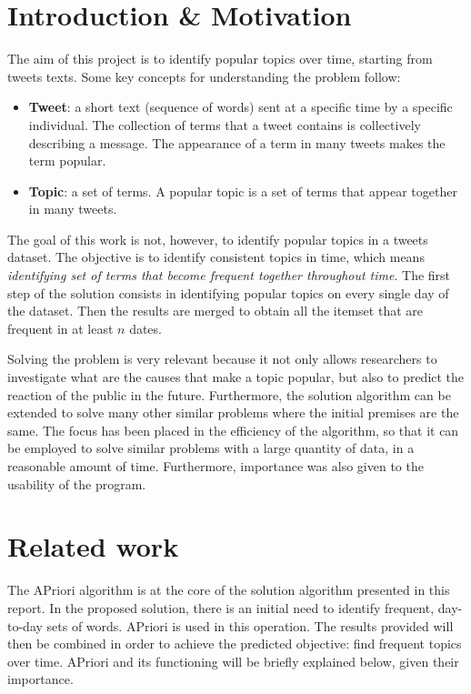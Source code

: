 
\section{Introduction \& Motivation}\label{sect_intro}

The aim of this project is to identify popular topics over time, starting from tweets texts. Some key concepts for understanding the problem follow:
\begin{itemize}
  \item \textbf{Tweet}: a short text (sequence of words) sent at a specific time by a specific individual. The collection of terms that a tweet contains is collectively describing a message. The appearance of a term in many tweets makes the term popular.
  \item \textbf{Topic}: a set of terms. A popular topic is a set of terms that appear together in many tweets.
\end{itemize}

The goal of this work is not, however, to identify popular topics in a tweets dataset. The objective is to identify consistent topics in time, which means \textit{identifying set of terms that become frequent together throughout time}. The first step of the solution consists in identifying popular topics on every single day of the dataset. Then the results are merged to obtain all the itemset that are frequent in at least $n$ dates.

Solving the problem is very relevant because it not only allows researchers to investigate what are the causes that make a topic popular, but also to predict the reaction of the public in the future. Furthermore, the solution algorithm can be extended to solve many other similar problems where the initial premises are the same. The focus has been placed in the efficiency of the algorithm, so that it can be employed to solve similar problems with a large quantity of data, in a reasonable amount of time. Furthermore, importance was also given to the usability of the program.


\section{Related work}\label{sect_rel_work}

The APriori algorithm is at the core of the solution algorithm presented in this report. In the proposed solution, there is an initial need to identify frequent, day-to-day sets of words. APriori is used in this operation. The results provided will then be combined in order to achieve the predicted objective: find frequent topics over time. APriori and its functioning will be briefly explained below, given their importance.

